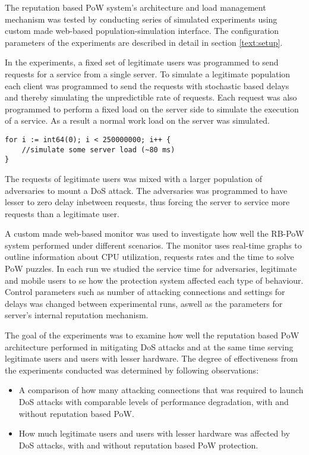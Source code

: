 The reputation based PoW system's architecture and load management mechanism was tested by conducting series of simulated experiments using custom made web-based population-simulation interface. The configuration parameters of the experiments are described in detail in section \ref{text:setup}.

In the experiments, a fixed set of legitimate users was programmed to send requests for a service from a single server. To simulate a legitimate population each client was programmed to send the requests with stochastic based delays and thereby simulating the unpredictible rate of requests. Each request was also programmed to perform a fixed load on the server side to simulate the execution of a service. As a result a normal work load on the server was simulated. 
\begin{verbatim}	
for i := int64(0); i < 250000000; i++ {
	//simulate some server load (~80 ms)
}
\end{verbatim}
The requests of legitimate users was mixed with a larger population of adversaries to mount a DoS attack. The adversaries was programmed to have lesser to zero delay inbetween requests, thus forcing the server to service more requests than a legitimate user. 

A custom made web-based monitor was used to investigate how well the RB-PoW system performed under different scenarios. The monitor uses real-time graphs to outline information about CPU utilization, requests rates and the time to solve PoW puzzles. In each run we studied the service time for adversaries, legitimate and mobile users to se how the protection system affected each type of behaviour. Control parameters such as number of attacking connections and settings for delays was changed between experimental runs, aswell as the parameters for server's internal reputation mechanism.

The goal of the experiments was to examine how well the reputation based PoW architecture performed in mitigating DoS attacks and at the same time serving legitimate users and users with lesser hardware. The degree of effectiveness from the experiments conducted was determined by following observations:

\begin{itemize}
\item A comparison of how many attacking connections that was required to launch DoS attacks with comparable levels of performance degradation, with and without reputation based PoW.

\item How much legitimate users and users with lesser hardware was affected by DoS attacks, with and without reputation based PoW protection.
\end{itemize}

